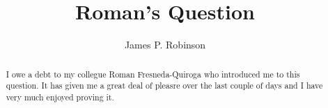 \documentclass[a4paper,12pt]{article}
\title{Roman's Question}
\author{James P. Robinson}
\begin{document}
\maketitle
\begin{abstract}
I owe a debt to my collegue Roman Fresneda-Quiroga who introduced me to this question. It has given me a great deal of pleasre over the last couple of days and I have very much enjoyed proving it.
\end{abstract}
\end{document}
